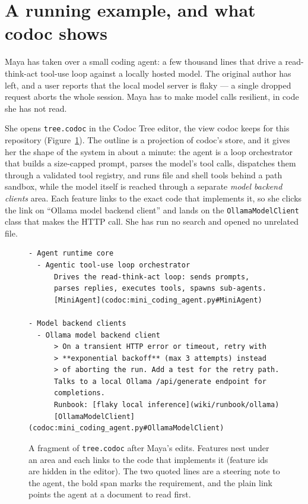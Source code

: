 \documentclass[sigconf,nonacm]{acmart}
\begin{document}
\section{A running example, and what codoc shows}

Maya has taken over a small coding agent: a few thousand lines that drive a
read-think-act tool-use loop against a locally hosted model. The original author
has left, and a user reports that the local model server is flaky --- a single
dropped request aborts the whole session. Maya has to make model calls resilient,
in code she has not read.

She opens \texttt{tree.codoc} in the Codoc Tree editor, the view codoc keeps for
this repository (Figure~\ref{fig:tree}). The outline is a projection of codoc's
store, and it gives her the shape of the system in about a minute: the agent is a
loop orchestrator that builds a size-capped prompt, parses the model's tool calls,
dispatches them through a validated tool registry, and runs file and shell tools
behind a path sandbox, while the model itself is reached through a separate
\emph{model backend clients} area. Each feature links to the exact code that
implements it, so she clicks the link on ``Ollama model backend client'' and lands
on the \texttt{OllamaModelClient} class that makes the HTTP call. She has run no
search and opened no unrelated file.

\begin{figure}[t]
\footnotesize
\begin{verbatim}
- Agent runtime core
  - Agentic tool-use loop orchestrator
      Drives the read-think-act loop: sends prompts,
      parses replies, executes tools, spawns sub-agents.
      [MiniAgent](codoc:mini_coding_agent.py#MiniAgent)

- Model backend clients
  - Ollama model backend client
      > On a transient HTTP error or timeout, retry with
      > **exponential backoff** (max 3 attempts) instead
      > of aborting the run. Add a test for the retry path.
      Talks to a local Ollama /api/generate endpoint for
      completions.
      Runbook: [flaky local inference](wiki/runbook/ollama)
      [OllamaModelClient](codoc:mini_coding_agent.py#OllamaModelClient)
\end{verbatim}
\caption{A fragment of \texttt{tree.codoc} after Maya's edits. Features nest under
an area and each links to the code that implements it (feature ids are hidden in
the editor). The two quoted lines are a steering note to the agent, the bold span
marks the requirement, and the plain link points the agent at a document to read
first.}
\label{fig:tree}
\end{figure}
\end{document}
